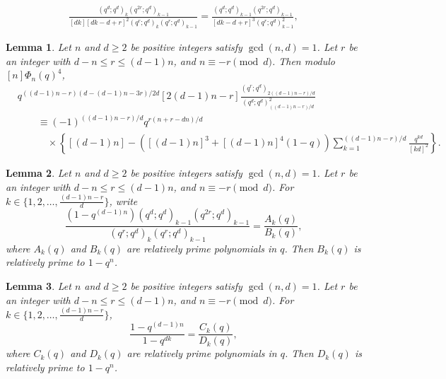 \documentclass[10pt,a4paper]{amsart}
\newtheorem{lem}{Lemma}
\begin{document}
\begin{align}\label{eq:iden}
    \frac{(q^d;q^d)_{k}(q^{2r};q^d)_{k-1}}{[dk][dk-d+r]^2 (q^r;q^d)_k(q^r;q^d)_{k-1}}=
    \frac{(q^d;q^d)_{k-1}(q^{2r};q^d)_{k-1}}{[dk-d+r]^3(q^r;q^d)^2_{k-1}},
\end{align}

\begin{lem}\label{lem:F-dn}
    Let $n$ and $d\geqslant2$ be positive integers satisfy $\gcd(n,d)=1$. Let $r$ be an integer with $d-n\leqslant r\leqslant (d-1)n$, and $n\equiv -r\pmod{d}$.
    Then modulo $[n]\Phi_n(q)^4$,
    \begin{align*}\label{eq:F-dn}
        &q^{((d-1)n-r)(d-(d-1)n-3r)/2d}[2(d-1)n-r]\frac{(q^r;q^d)_{2((d-1)n-r)/d}}{(q^d;q^d)^2_{((d-1)n-r)/d}}\nonumber\\
        &\hspace{2em}\equiv(-1)^{((d-1)n-r)/d} q^{r(n+r-dn)/d}\nonumber\\
        &\hspace{3em}\times\left\{[(d-1)n]-([(d-1)n]^3+[(d-1)n]^4(1-q))\sum_{k=1}^{((d-1)n-r)/d}\frac{q^{kd}}{[kd]^2}\right\}.
    \end{align*}
\end{lem}

\begin{lem}\label{lem:G-div-dn}
    Let $n$ and $d\geqslant2$ be positive integers satisfy $\gcd(n,d)=1$. Let $r$ be an integer with $d-n\leqslant r\leqslant (d-1)n$, and $n\equiv -r\pmod{d}$.
    For $k\in \{1,2,\dots, \frac{(d-1)n-r}{d}\}$, write \[\frac{(1-q^{(d-1)n})(q^d;q^d)_{k-1}(q^{2r};q^d)_{k-1}}{(q^r;q^d)_{k}(q^r;q^d)_{k-1}}
    =\frac{A_k(q)}{B_k(q)},\] where $A_k(q)$ and $B_k(q)$ are relatively prime polynomials in $q$. Then $B_k(q)$ is relatively prime to $1-q^n$.
\end{lem}

\begin{lem}\label{lem:q-integers-dn}
    Let $n$ and $d\geqslant2$ be positive integers satisfy $\gcd(n,d)=1$. Let $r$ be an integer with $d-n\leqslant r\leqslant (d-1)n$, and $n\equiv -r\pmod{d}$.
    For $k\in \{1,2,\dots, \frac{(d-1)n-r}{d}\}$, \[\frac{1-q^{(d-1)n}}{1-q^{dk}}=\frac{C_k(q)}{D_k(q)},\] where $C_k(q)$ and $D_k(q)$ are relatively prime polynomials in $q$. 
    Then $D_k(q)$ is relatively prime to $1-q^n$.
\end{lem}
\end{document}
